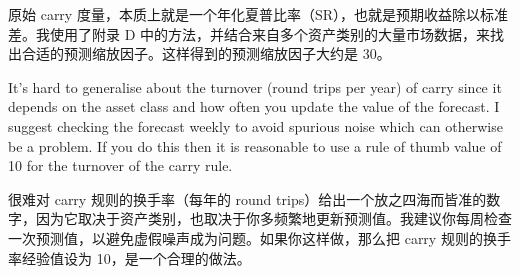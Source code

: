 \begin{chineseblock}原始 carry 度量，本质上就是一个年化夏普比率（SR），也就是预期收益除以标准差。我使用了附录 D 中的方法，并结合来自多个资产类别的大量市场数据，来找出合适的预测缩放因子。这样得到的预测缩放因子大约是 30。 \end{chineseblock}


\begin{englishblock} It's hard to generalise about the turnover (round trips per year) of carry since it depends on the asset class and how often you update the value of the forecast. I suggest checking the forecast weekly to avoid spurious noise which can otherwise be a problem. If you do this then it is reasonable to use a rule of thumb value of 10 for the turnover of the carry rule. \end{englishblock}

\begin{chineseblock}很难对 carry 规则的换手率（每年的 round trips）给出一个放之四海而皆准的数字，因为它取决于资产类别，也取决于你多频繁地更新预测值。我建议你每周检查一次预测值，以避免虚假噪声成为问题。如果你这样做，那么把 carry 规则的换手率经验值设为 10，是一个合理的做法。\end{chineseblock}
